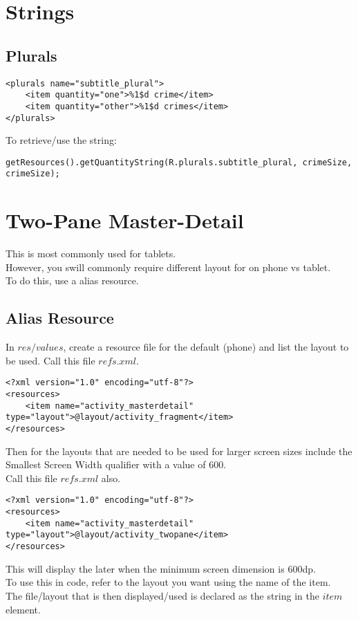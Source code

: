 \documentclass[]{article}
\begin{document}
\section{Strings}
\subsection{Plurals}
\begin{lstlisting}
<plurals name="subtitle_plural">
	<item quantity="one">%1$d crime</item>
	<item quantity="other">%1$d crimes</item>
</plurals>
\end{lstlisting}
To retrieve/use the string:
\begin{lstlisting}
getResources().getQuantityString(R.plurals.subtitle_plural, crimeSize, crimeSize);
\end{lstlisting}

\section{Two-Pane Master-Detail}
This is most commonly used for tablets.  
\\
However, you swill commonly require different layout for on phone vs tablet.
\\
To do this, use a alias resource.
\subsection{Alias Resource}
In $res/values$, create a resource file for the default (phone) and list the layout to be used.  Call this file $refs.xml$.
\begin{lstlisting}
<?xml version="1.0" encoding="utf-8"?>
<resources>
	<item name="activity_masterdetail" type="layout">@layout/activity_fragment</item>
</resources>
\end{lstlisting}
Then for the layouts that are needed to be used for larger screen sizes include the Smallest Screen Width qualifier with a value of 600.
\\
Call this file $refs.xml$ also.
\begin{lstlisting}
<?xml version="1.0" encoding="utf-8"?>
<resources>
	<item name="activity_masterdetail" type="layout">@layout/activity_twopane</item>
</resources>
\end{lstlisting}
This will display the later when the minimum screen dimension is 600dp.
\\
To use this in code, refer to the layout you want using the name of the item.
\\
The file/layout that is then displayed/used is declared as the string in the $item$ element.
\end{document}
